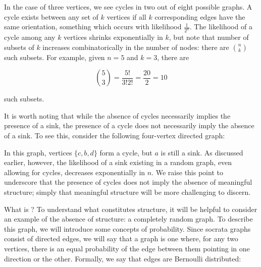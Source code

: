 In the case of three vertices, we see cycles in two out of eight possible graphs.
A cycle exists between any set of $k$ vertices if all $k$ corresponding edges have the same orientation, something which occurs with likelihood $\frac{1}{2^n}$.
The likelihood of a cycle among any $k$ vertices shrinks exponentially in $k$, but note that number of subsets of $k$ increases combinatorically in the number of nodes: there are ${n}\choose{k}$ such subsets.
For example, given $n = 5$ and $k = 3$, there are

\[
{{5}\choose{3}} = \frac{5!}{3! 2!} = \frac{20}{2} = 10
\]

such subsets.

It is worth noting that while the absence of cycles necessarily implies the presence of a sink, the presence of a cycle does not necessarily imply the absence of a sink.
To see this, consider the following four-vertex directed graph:

\begin{center}
\end{center}

In this graph, vertices $\{c, b, d\}$ form a cycle, but $a$ is still a sink.
As discussed earlier, however, the likelihood of a sink existing in a random graph, even allowing for cycles, decreases exponentially in $n$.
We raise this point to underscore that the presence of cycles does not imply the absence of meaningful structure; simply that meaningful structure will be more challenging to discern.

\bigskip

What is ?
To understand what constitutes structure, it will be helpful to consider an example of the absence of structure: a completely random graph.
To describe this graph, we will introduce some concepts of probability.
Since socrata graphs consist of directed edges, we will say that a  graph is one where, for any two vertices, there is an equal probability of the edge between them pointing in one direction or the other.
Formally, we say that edges are Bernoulli distributed:

